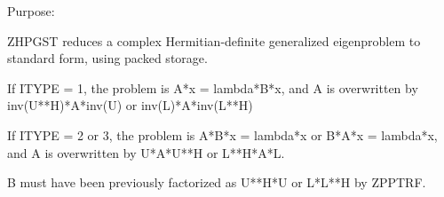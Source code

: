  \begin{DoxyParagraph}{Purpose\+: }
\begin{DoxyVerb} ZHPGST reduces a complex Hermitian-definite generalized
 eigenproblem to standard form, using packed storage.

 If ITYPE = 1, the problem is A*x = lambda*B*x,
 and A is overwritten by inv(U**H)*A*inv(U) or inv(L)*A*inv(L**H)

 If ITYPE = 2 or 3, the problem is A*B*x = lambda*x or
 B*A*x = lambda*x, and A is overwritten by U*A*U**H or L**H*A*L.

 B must have been previously factorized as U**H*U or L*L**H by ZPPTRF.\end{DoxyVerb}
 
\end{DoxyParagraph}

